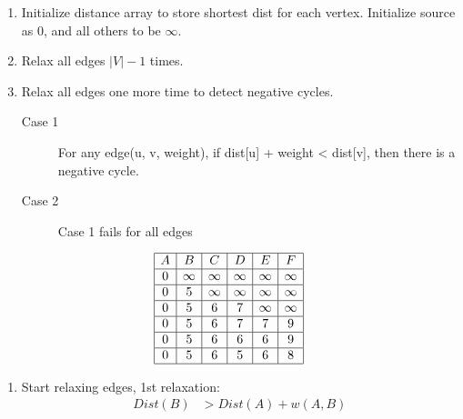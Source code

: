 \documentclass{article}
\begin{document}
\begin{multicols*}{2}
    \begin{multicols*}{2}
        \begin{enumerate}
            \item Initialize distance array to store shortest dist for each
                  vertex. Initialize source as 0, and all others to be \(\infty\).
            \item Relax all edges \(|V| - 1\) times.
            \item Relax all edges one more time to detect negative cycles.
                  \begin{description}
                      \item[Case 1] For any edge(u, v, weight), if dist[u] + weight < dist[v],
                          then there is a negative cycle.
                      \item[Case 2] Case 1 fails for all edges
                  \end{description}
        \end{enumerate}
        \columnbreak
        \begin{align*}
            \begin{array}{|c|c|c|c|c|c|}
                \hline
                A & B      & C      & D      & E      & F      \\
                \hline
                0 & \infty & \infty & \infty & \infty & \infty \\
                \hline
                0 & 5      & \infty & \infty & \infty & \infty \\
                \hline
                0 & 5      & 6      & 7      & \infty & \infty \\
                \hline
                0 & 5      & 6      & 7      & 7      & 9      \\
                \hline
                0 & 5      & 6      & 6      & 6      & 9      \\
                \hline
                0 & 5      & 6      & 5      & 6      & 8      \\
                \hline
            \end{array}
        \end{align*}
    \end{multicols*}
    \begin{enumerate}
        \item Start relaxing edges, 1st relaxation:
              \begin{align*}
                  Dist(B) & > Dist(A) + w(A, B)             \\

\end{align*}
\end{enumerate}
\end{multicols*}
\end{document}
